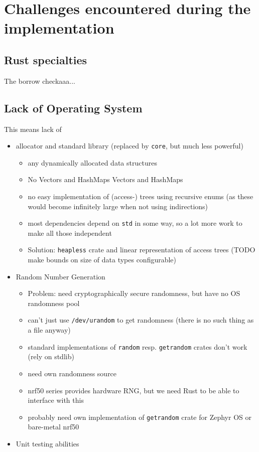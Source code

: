 \chapter{Challenges encountered during the implementation}\label{chapter:challenges}

\section{Rust specialties}
The borrow checkaaa...

\section{Lack of Operating System}
This means lack of

\begin{itemize}
    \item allocator and standard library (replaced by \texttt{core}, but much less powerful)
    \begin{itemize}
        \item any dynamically allocated data structures
        \item No Vectors and HashMaps Vectors and HashMaps
        \item no easy implementation of (access-) trees using recursive enums (as these would become infinitely large when not using indirections)
        \item most dependencies depend on \texttt{std} in some way, so a lot more work to make all those independent
        \item Solution: \texttt{heapless} crate and linear representation of access trees (TODO make bounds on size of data types configurable)
    \end{itemize}
    \item Random Number Generation
    \begin{itemize}
        \item Problem: need cryptographically secure randomness, but have no OS randomness pool
        \item can't just use \texttt{/dev/urandom} to get randomness (there is no such thing as a file anyway)
        \item standard implementations of \texttt{random} resp. \texttt{getrandom} crates don't work (rely on stdlib)
        \item need own randomness source
        \item nrf50 series provides hardware RNG, but we need Rust to be able to interface with this
        \item probably need own implementation of \texttt{getrandom} crate for Zephyr OS or bare-metal nrf50
    \end{itemize}
    \item Unit testing abilities
\end{itemize}


